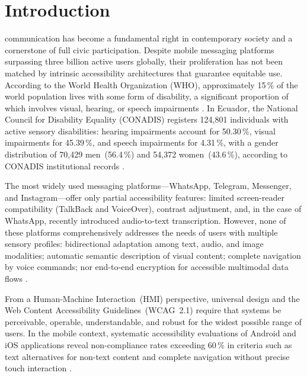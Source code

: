 \documentclass[journal]{IEEEtran}
\begin{document}
	\section{Introduction}
	\label{sec:intro}
	 communication has become a fundamental
	right in contemporary society and a cornerstone of full civic
	participation.
	Despite mobile messaging platforms surpassing three billion active
	users globally, their proliferation has not been matched by intrinsic
	accessibility architectures that guarantee equitable use.
	According to the World Health Organization (WHO), approximately 15\,\%
	of the world population lives with some form of disability, a
	significant proportion of which involves visual, hearing, or speech
	impairments \cite{who2011}.
	In Ecuador, the National Council for Disability Equality
	(CONADIS) registers 124{,}801 individuals with active sensory
	disabilities: hearing impairments account for 50.30\,\%, visual
	impairments for 45.39\,\%, and speech impairments for 4.31\,\%,
	with a gender distribution of 70{,}429 men~(56.4\,\%) and 54{,}372
	women~(43.6\,\%), according to CONADIS institutional records
	\cite{conadis2024}.
	
	The most widely used messaging platforms---WhatsApp, Telegram,
	Messenger, and Instagram---offer only partial accessibility
	features: limited screen-reader compatibility
	(TalkBack and VoiceOver), contrast adjustment, and, in the
	case of WhatsApp, recently introduced audio-to-text transcription.
	However, none of these platforms comprehensively addresses
	the needs of users with multiple sensory profiles:
	bidirectional adaptation among text, audio, and image modalities;
	automatic semantic description of visual content;
	complete navigation by voice commands; nor
	end-to-end encryption for accessible multimodal data
	flows \cite{bercaru2024,weichbroth2020}.
	
	From a Human-Machine Interaction~(HMI) perspective, universal
	design \cite{story1998} and the Web Content Accessibility
	Guidelines~(WCAG~2.1) \cite{w3c2018} require that systems be
	perceivable, operable, understandable, and robust for the
	widest possible range of users.
	In the mobile context, systematic accessibility evaluations of
	Android and iOS applications reveal non-compliance rates
	exceeding 60\,\% in criteria such as text alternatives for
	non-text content and complete navigation without precise
	touch interaction \cite{chen2022,acosta2021}.
	
\end{document}
